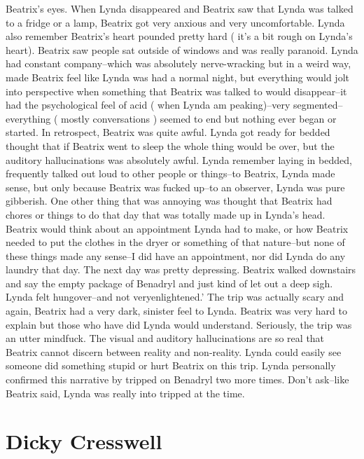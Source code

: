 \documentclass[12pt]{book}
\begin{document}
Beatrix's eyes. When Lynda disappeared and Beatrix saw that Lynda was talked to a fridge or a lamp, Beatrix got very anxious and very uncomfortable. Lynda also remember Beatrix's heart pounded pretty hard ( it's a bit rough on Lynda's heart). Beatrix saw people sat outside of windows and was really paranoid. Lynda had constant company--which was absolutely nerve-wracking but in a weird way, made Beatrix feel like Lynda was had a normal night, but everything would jolt into perspective when something that Beatrix was talked to would disappear--it had the psychological feel of acid ( when Lynda am peaking)--very segmented--everything ( mostly conversations ) seemed to end but nothing ever began or started. In retrospect, Beatrix was quite awful. Lynda got ready for bedded thought that if Beatrix went to sleep the whole thing would be over, but the auditory hallucinations was absolutely awful. Lynda remember laying in bedded, frequently talked out loud to other people or things--to Beatrix, Lynda made sense, but only because Beatrix was fucked up--to an observer, Lynda was pure gibberish. One other thing that was annoying was thought that Beatrix had chores or things to do that day that was totally made up in Lynda's head. Beatrix would think about an appointment Lynda had to make, or how Beatrix needed to put the clothes in the dryer or something of that nature--but none of these things made any sense--I did have an appointment, nor did Lynda do any laundry that day. The next day was pretty depressing. Beatrix walked downstairs and say the empty package of Benadryl and just kind of let out a deep sigh. Lynda felt hungover--and not veryenlightened.' The trip was actually scary and again, Beatrix had a very dark, sinister feel to Lynda. Beatrix was very hard to explain but those who have did Lynda would understand. Seriously, the trip was an utter mindfuck. The visual and auditory hallucinations are so real that Beatrix cannot discern between reality and non-reality. Lynda could easily see someone did something stupid or hurt Beatrix on this trip. Lynda personally confirmed this narrative by tripped on Benadryl two more times. Don't ask--like Beatrix said, Lynda was really into tripped at the time.



\chapter{Dicky Cresswell}
\end{document}
